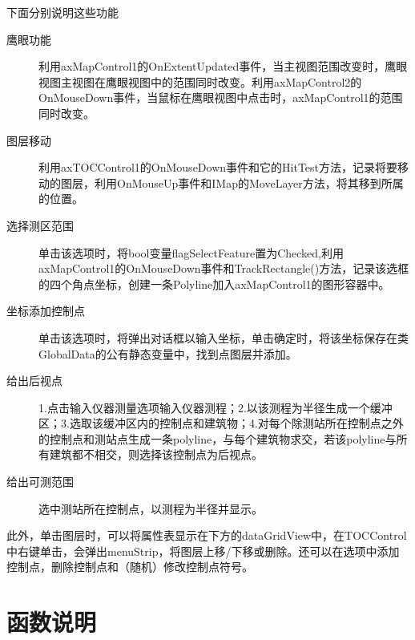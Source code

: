 \documentclass[twoside,color=blue,mathpazo,titlestyle=hang,12pt]{elegantbook}
\numberwithin{equation}{section}
\begin{document}
下面分别说明这些功能
\begin{description}
\item[鹰眼功能] 利用axMapControl1的OnExtentUpdated事件，当主视图范围改变时，鹰眼视图主视图在鹰眼视图中的范围同时改变。利用axMapControl2的OnMouseDown事件，当鼠标在鹰眼视图中点击时，axMapControl1的范围同时改变。
\item[图层移动] 利用axTOCControl1的OnMouseDown事件和它的HitTest方法，记录将要移动的图层，利用OnMouseUp事件和IMap的MoveLayer方法，将其移到所属的位置。
\item[选择测区范围] 单击该选项时，将bool变量flagSelectFeature置为Checked,利用axMapControl1的OnMouseDown事件和TrackRectangle()方法，记录该选框的四个角点坐标，创建一条Polyline加入axMapControl1的图形容器中。
\item[坐标添加控制点] 单击该选项时，将弹出对话框以输入坐标，单击确定时，将该坐标保存在类GlobalData的公有静态变量中，找到点图层并添加。
\item[给出后视点] 1.点击输入仪器测量选项输入仪器测程；2.以该测程为半径生成一个缓冲区；3.选取该缓冲区内的控制点和建筑物；4.对每个除测站所在控制点之外的控制点和测站点生成一条polyline，与每个建筑物求交，若该polyline与所有建筑都不相交，则选择该控制点为后视点。
\item[给出可测范围] 选中测站所在控制点，以测程为半径并显示。
\end{description}

此外，单击图层时，可以将属性表显示在下方的dataGridView中，在TOCControl中右键单击，会弹出menuStrip，将图层上移/下移或删除。还可以在选项中添加控制点，删除控制点和（随机）修改控制点符号。

\section{函数说明}
\end{document}
